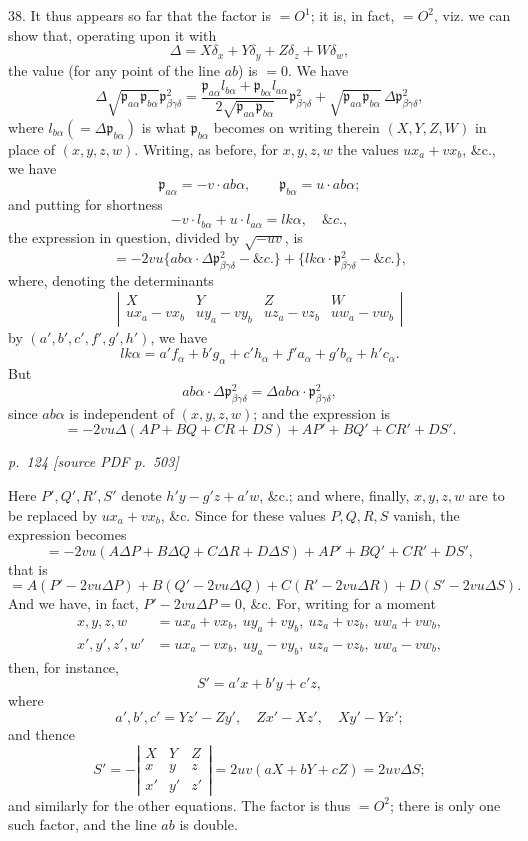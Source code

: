 \documentclass[11pt,a4paper]{article}
\newcommand{\sourcepage}[2]{%
  \bigskip
  \noindent\textit{p.~#1 [source PDF p.~#2]}%
  \par\smallskip
}
\newcommand{\p}{\mathfrak p}
\begin{document}
38. It thus appears so far that the factor is $=O^1$; it is, in fact, $=O^2$, viz.
we can show that, operating upon it with
\[
\Delta=X\delta_x+Y\delta_y+Z\delta_z+W\delta_w,
\]
the value (for any point of the line $ab$) is $=0$. We have
\[
\Delta\sqrt{\p_{a\alpha}\p_{b\alpha}}\p^2_{\beta\gamma\delta}
=\frac{\p_{a\alpha}l_{b\alpha}+\p_{b\alpha}l_{a\alpha}}
       {2\sqrt{\p_{a\alpha}\p_{b\alpha}}}\p^2_{\beta\gamma\delta}
+\sqrt{\p_{a\alpha}\p_{b\alpha}}\,
  \Delta\p^2_{\beta\gamma\delta},
\]
where $l_{b\alpha}(=\Delta\p_{b\alpha})$ is what $\p_{b\alpha}$ becomes on writing
therein $(X,Y,Z,W)$ in place of $(x,y,z,w)$. Writing, as before, for $x,y,z,w$
the values $ux_a+vx_b$, \&c., we have
\[
\p_{a\alpha}=-v\cdot ab\alpha,\qquad
\p_{b\alpha}=u\cdot ab\alpha;
\]
and putting for shortness
\[
-v\cdot l_{b\alpha}+u\cdot l_{a\alpha}=lk\alpha,\quad \&c.,
\]
the expression in question, divided by $\sqrt{-uv}$, is
\[
=-2vu\{ab\alpha\cdot\Delta\p^2_{\beta\gamma\delta}-\&c.\}
+\{lk\alpha\cdot\p^2_{\beta\gamma\delta}-\&c.\},
\]
where, denoting the determinants
\[
\left|\begin{array}{cccc}
X&Y&Z&W\\
ux_a-vx_b&uy_a-vy_b&uz_a-vz_b&uw_a-vw_b
\end{array}\right|
\]
by $(a',b',c',f',g',h')$, we have
\[
lk\alpha=a'f_\alpha+b'g_\alpha+c'h_\alpha+f'a_\alpha+g'b_\alpha+h'c_\alpha.
\]
But
\[
ab\alpha\cdot\Delta\p^2_{\beta\gamma\delta}
=\Delta ab\alpha\cdot\p^2_{\beta\gamma\delta},
\]
since $ab\alpha$ is independent of $(x,y,z,w)$; and the expression is
\[
=-2vu\Delta(AP+BQ+CR+DS)+AP'+BQ'+CR'+DS'.
\]

\sourcepage{124}{503}
Here $P',Q',R',S'$ denote $h'y-g'z+a'w$, \&c.; and where, finally, $x,y,z,w$ are
to be replaced by $ux_a+vx_b$, \&c. Since for these values $P,Q,R,S$ vanish, the
expression becomes
\[
=-2vu(A\Delta P+B\Delta Q+C\Delta R+D\Delta S)+AP'+BQ'+CR'+DS',
\]
that is
\[
=A(P'-2vu\Delta P)+B(Q'-2vu\Delta Q)
 +C(R'-2vu\Delta R)+D(S'-2vu\Delta S).
\]
And we have, in fact, $P'-2vu\Delta P=0$, \&c. For, writing for a moment
\[
\begin{aligned}
x,y,z,w&=ux_a+vx_b,\ uy_a+vy_b,\ uz_a+vz_b,\ uw_a+vw_b,\\
x',y',z',w'&=ux_a-vx_b,\ uy_a-vy_b,\ uz_a-vz_b,\ uw_a-vw_b,
\end{aligned}
\]
then, for instance,
\[
S'=a'x+b'y+c'z,
\]
where
\[
a',b',c'=Yz'-Zy',\quad Zx'-Xz',\quad Xy'-Yx';
\]
and thence
\[
S'=-\left|\begin{array}{ccc}
X&Y&Z\\
x&y&z\\
x'&y'&z'
\end{array}\right|
=2uv(aX+bY+cZ)=2uv\Delta S;
\]
and similarly for the other equations. The factor is thus $=O^2$; there is only
one such factor, and the line $ab$ is double.
\end{document}
